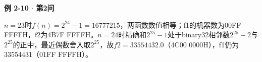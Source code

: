 {\color{ink}\bfseries 例 2-10 \(\cdot \) 第2问}\par\vspace{1bp}\(n=\allowbreak{}23\)时\(f(n)=\allowbreak{}2^{24}-1=\allowbreak{}16777215\)，两函数数值相等；f1的机器数为00FF FFFFH，f2为4B7F FFFFH。\(n=\allowbreak{}24\)时精确和\(2^{25}-1\)处于binary32相邻数\(2^{25}-2\)与\(2^{25}\)的正中，最近偶数舍入取\(2^{25}\)，故\(f2=\allowbreak{}33554432.0\)（4C00 0000H），f1仍为33554431（01FF FFFFH）。
